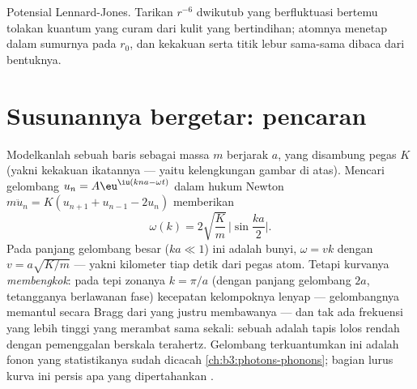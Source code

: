 \begin{omfigure}

{\small Potensial Lennard-Jones. Tarikan $r^{-6}$ dwikutub yang
berfluktuasi bertemu tolakan kuantum yang curam dari kulit yang
bertindihan; atomnya menetap dalam sumurnya pada $r_0$, dan
kekakuan serta titik lebur  sama-sama dibaca dari bentuknya.}
\end{omfigure}

\section{Susunannya bergetar: pencaran}

\begin{theorem}\label{thm:b3:crystalline-solids:dispersion}
Modelkanlah sebuah baris  sebagai massa $m$ berjarak $a$, yang
disambung pegas $K$ (yakni kekakuan ikatannya --- yaitu kelengkungan
gambar di atas). Mencari gelombang $u_n = A\eu^{\iu(kna - \omega t)}$
dalam hukum Newton
$m\ddot u_n = K(u_{n+1} + u_{n-1} - 2u_n)$ memberikan
\[
\omega(k) = 2\sqrt{\frac{K}{m}}\,\Big|\sin\frac{ka}{2}\Big| .
\]
Pada panjang gelombang besar ($ka \ll 1$) ini adalah bunyi, $\omega = vk$ dengan
$v = a\sqrt{K/m}$ --- yakni kilometer tiap detik dari pegas atom.
Tetapi kurvanya \emph{membengkok}: pada tepi zonanya $k = \pi/a$
(dengan panjang gelombang $2a$, tetangganya berlawanan fase) kecepatan
kelompoknya lenyap --- gelombangnya memantul secara Bragg dari  yang
justru membawanya --- dan tak ada frekuensi yang lebih tinggi yang
merambat sama sekali: sebuah  adalah tapis lolos rendah dengan
pemenggalan berskala terahertz. Gelombang terkuantumkan ini adalah
fonon yang statistikanya sudah dicacah \cref{ch:b3:photons-phonons};
bagian lurus kurva ini persis apa yang dipertahankan .
\end{theorem}

